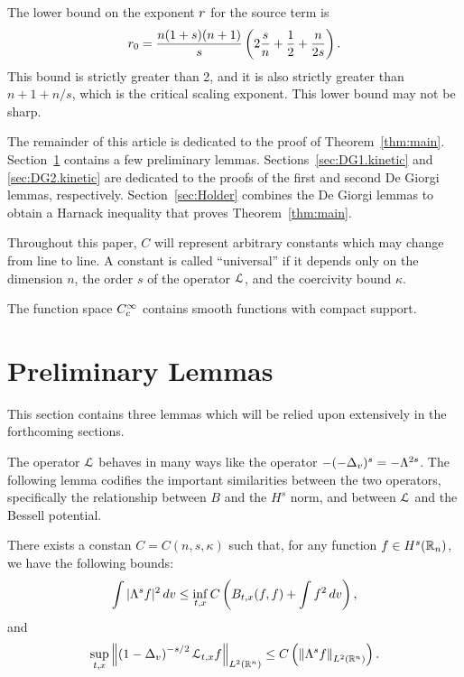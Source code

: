 The lower bound on the exponent ${r}$ for the source term is
\[ {r}_0 = \frac{n (1+s) (n+1)}{s} \left( 2 \frac{s}{n} + \frac{1}{2} + \frac{n}{2s} \right). \]
This bound is strictly greater than 2, and it is also strictly greater than $n+1+n/s$, which is the critical scaling exponent.  This lower bound may not be sharp.   

The remainder of this article is dedicated to the proof of Theorem~\ref{thm:main}.  Section~\ref{sec:preliminaries} contains a few preliminary lemmas.  Sections~\ref{sec:DG1.kinetic} and \ref{sec:DG2.kinetic} are dedicated to the proofs of the first and second De Giorgi lemmas, respectively.  Section~\ref{sec:Holder} combines the De Giorgi lemmas to obtain a Harnack inequality that proves Theorem~\ref{thm:main}.  

Throughout this paper, $C$ will represent arbitrary constants which may change from line to line.  A constant is called ``universal'' if it depends only on the dimension $n$, the order $s$ of the operator $\mathcal{L}$, and the coercivity bound $\kappa$.  

The function space $C_c^\infty$ contains smooth functions with compact support.  



\section{Preliminary Lemmas} \label{sec:preliminaries}

This section contains three lemmas which will be relied upon extensively in the forthcoming sections.  

The operator $\mathcal{L}$ behaves in many ways like the operator $-(-\Delta_v)^{s} = - \Lambda^{2s}$.  The following lemma codifies the important similarities between the two operators, specifically the relationship between $B$ and the $H^s$ norm, and between $\mathcal{L}$ and the Bessell potential.  
\begin{lemma} \label{thm:B_and_Hs}
There exists a constan $C = C(n,s,\kappa)$ such that, for any function $f \in H^s(\mathbb{R}_n)$, we have the following bounds:
\[ \int |\Lambda^s f|^2 \,dv \leq \inf_{t,x} C\left( B_{t,x}(f,f) + \int f^2 \,dv \right), \]
and
\[ \sup_{t,x} \left\lVert\left( 1-\Delta_v \right)^{-s/2} \mathcal{L}_{t,x} f\right\rVert_{ L^2(\mathbb{R}^n) } \leq C \left(  \left\lVert\Lambda^s f\right\rVert_{L^2(\mathbb{R}^n)} \right). \]

\end{lemma}

